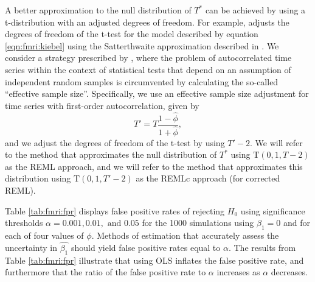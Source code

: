 A better approximation to the null distribution of $T^*$ can be achieved by using a t-distribution with an adjusted degrees of freedom. For example, \citet{kiebel:holmes:spm:2007} adjusts the degrees of freedom of the t-test for the model described by equation \eqref{eqn:fmri:kiebel} using the Satterthwaite approximation described in \citet{wors:frist:color:1995}. We consider a strategy prescribed by \citet{dawdy:matalas:ess:1964}, where the problem of autocorrelated time series within the context of statistical tests that depend on an assumption of independent random samples is circumvented by calculating the so-called ``effective sample size''. Specifically, we use an effective sample size adjustment for time series with first-order autocorrelation, given by
\begin{equation}
T' = T\frac{1-\hat{\phi}}{1+\hat{\phi}}, \label{eqn:fmri:ess}
\end{equation}
and we adjust the degrees of freedom of the t-test by using $T' - 2$. We will refer to the method that approximates the null distribution of $T^*$ using $\mbox{T}(0,1,T-2)$ as the REML approach, and we will refer to the method that approximates this distribution using $\mbox{T}(0,1,T'-2)$ as the REMLc approach (for corrected REML).

Table \ref{tab:fmri:fpr} displays false positive rates of rejecting $H_0$ using significance thresholds $\alpha = 0.001, 0.01, \mbox{ and } 0.05$ for the 1000 simulations using $\beta_1 = 0$ and for each of four values of $\phi$. Methods of estimation that accurately assess the uncertainty in $\hat{\beta_1}$ should yield false positive rates equal to $\alpha$. The results from Table \ref{tab:fmri:fpr} illustrate that using OLS inflates the false positive rate, and furthermore that the ratio of the false positive rate to $\alpha$ increases as $\alpha$ decreases. %

